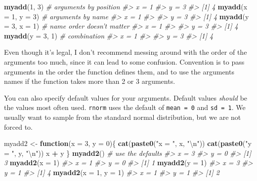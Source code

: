 \documentclass[]{book}
\newenvironment{Shaded}{\begin{snugshade}}{\end{snugshade}}
\newcommand{\KeywordTok}[1]{\textcolor[rgb]{0.13,0.29,0.53}{\textbf{#1}}}
\newcommand{\DataTypeTok}[1]{\textcolor[rgb]{0.13,0.29,0.53}{#1}}
\newcommand{\DecValTok}[1]{\textcolor[rgb]{0.00,0.00,0.81}{#1}}
\newcommand{\CharTok}[1]{\textcolor[rgb]{0.31,0.60,0.02}{#1}}
\newcommand{\StringTok}[1]{\textcolor[rgb]{0.31,0.60,0.02}{#1}}
\newcommand{\CommentTok}[1]{\textcolor[rgb]{0.56,0.35,0.01}{\textit{#1}}}
\newcommand{\ControlFlowTok}[1]{\textcolor[rgb]{0.13,0.29,0.53}{\textbf{#1}}}
\newcommand{\OperatorTok}[1]{\textcolor[rgb]{0.81,0.36,0.00}{\textbf{#1}}}
\newcommand{\NormalTok}[1]{#1}
\let\BeginKnitrBlock\begin \let\EndKnitrBlock\end
\begin{document}
\begin{Shaded}
\begin{Highlighting}[]
\KeywordTok{myadd}\NormalTok{(}\DecValTok{1}\NormalTok{, }\DecValTok{3}\NormalTok{)            }\CommentTok{# arguments by position}
\CommentTok{#> x = 1}
\CommentTok{#> y = 3}
\CommentTok{#> [1] 4}
\KeywordTok{myadd}\NormalTok{(}\DataTypeTok{x =} \DecValTok{1}\NormalTok{, }\DataTypeTok{y =} \DecValTok{3}\NormalTok{)    }\CommentTok{# arguments by name}
\CommentTok{#> x = 1}
\CommentTok{#> }
\CommentTok{#> y = 3}
\CommentTok{#> [1] 4}
\KeywordTok{myadd}\NormalTok{(}\DataTypeTok{y =} \DecValTok{3}\NormalTok{, }\DataTypeTok{x =} \DecValTok{1}\NormalTok{)    }\CommentTok{# name order doesn't matter}
\CommentTok{#> x = 1}
\CommentTok{#> }
\CommentTok{#> y = 3}
\CommentTok{#> [1] 4}
\KeywordTok{myadd}\NormalTok{(}\DataTypeTok{y =} \DecValTok{3}\NormalTok{, }\DecValTok{1}\NormalTok{)        }\CommentTok{# combination}
\CommentTok{#> x = 1}
\CommentTok{#> }
\CommentTok{#> y = 3}
\CommentTok{#> [1] 4}
\end{Highlighting}
\end{Shaded}

\BeginKnitrBlock{rmdtip}
Even though it's legal, I don't recommend messing around with the order
of the arguments too much, since it can lead to some confusion.
Convention is to pass arguments in the order the function defines them,
and to use the arguments names if the function takes more than 2 or 3
arguments.
\EndKnitrBlock{rmdtip}

You can also specify default values for your arguments. Default values
\emph{should} be the values most often used. \texttt{rnorm} uses the
default of \texttt{mean\ =\ 0} and \texttt{sd\ =\ 1}. We usually want to
sample from the standard normal distribution, but we are not forced to.

\begin{Shaded}
\begin{Highlighting}[]
\NormalTok{myadd2 <-}\StringTok{ }\ControlFlowTok{function}\NormalTok{(}\DataTypeTok{x =} \DecValTok{3}\NormalTok{, }\DataTypeTok{y =} \DecValTok{0}\NormalTok{)\{}
  \KeywordTok{cat}\NormalTok{(}\KeywordTok{paste0}\NormalTok{(}\StringTok{"x = "}\NormalTok{, x, }\StringTok{"}\CharTok{\textbackslash{}n}\StringTok{"}\NormalTok{))}
  \KeywordTok{cat}\NormalTok{(}\KeywordTok{paste0}\NormalTok{(}\StringTok{"y = "}\NormalTok{, y, }\StringTok{"}\CharTok{\textbackslash{}n}\StringTok{"}\NormalTok{))}
\NormalTok{  x }\OperatorTok{+}\StringTok{ }\NormalTok{y}
\NormalTok{\}}
\KeywordTok{myadd2}\NormalTok{()              }\CommentTok{# use the defaults}
\CommentTok{#> x = 3}
\CommentTok{#> y = 0}
\CommentTok{#> [1] 3}
\KeywordTok{myadd2}\NormalTok{(}\DataTypeTok{x =} \DecValTok{1}\NormalTok{)}
\CommentTok{#> x = 1}
\CommentTok{#> y = 0}
\CommentTok{#> [1] 1}
\KeywordTok{myadd2}\NormalTok{(}\DataTypeTok{y =} \DecValTok{1}\NormalTok{)}
\CommentTok{#> x = 3}
\CommentTok{#> y = 1}
\CommentTok{#> [1] 4}
\KeywordTok{myadd2}\NormalTok{(}\DataTypeTok{x =} \DecValTok{1}\NormalTok{, }\DataTypeTok{y =} \DecValTok{1}\NormalTok{)}
\CommentTok{#> x = 1}
\CommentTok{#> y = 1}
\CommentTok{#> [1] 2}
\end{Highlighting}
\end{Shaded}
\end{document}
